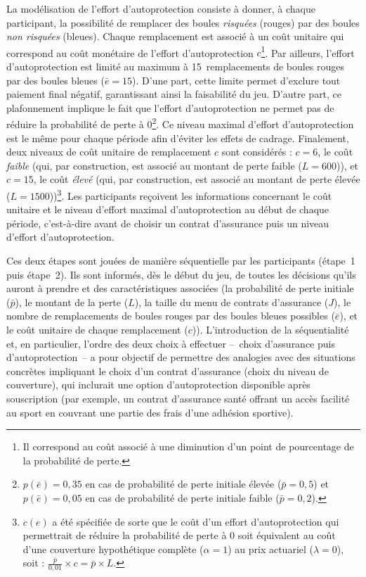 \begin{Article}
\begin{refsection}[Mouminoux]
\vspace{0,2cm}
La modélisation de l'effort d'autoprotection consiste à donner, à chaque participant, la possibilité de remplacer des boules \textit{risquées} (rouges) par des boules \textit{non risquées} (bleues). Chaque remplacement est associé à un coût unitaire qui correspond au coût monétaire de l'effort d'autoprotection $c$\footnote{Il correspond au coût associé à une diminution d'un point de pourcentage de la probabilité de perte.}. Par ailleurs, l'effort d'autoprotection est limité au maximum à 15~remplacements de boules rouges par des boules bleues ($\bar{e} = 15$). D’une part, cette limite permet d’exclure tout paiement final négatif, garantissant ainsi la faisabilité du jeu. D’autre part, ce plafonnement implique le fait que l'effort d'autoprotection ne permet pas de réduire la probabilité de perte à 0\footnote{$p(\bar{e}) = 0,35$ en cas de probabilité de perte initiale élevée ($\bar{p} = 0,5$) et $p(\bar{e}) = 0,05$ en cas de probabilité de perte initiale faible ($\bar{p} = 0,2$).}. Ce niveau maximal d'effort d'autoprotection est le même pour chaque période afin d'éviter les effets de cadrage. Finalement, deux niveaux de coût unitaire de remplacement $c$ sont considérés :  $c=6$, le coût \textit{faible} (qui, par construction, est associé au montant de perte faible ($L=600$)), et $c=15$, le coût \textit{élevé} (qui, par construction, est associé au montant de perte élevée ($L=1500$))\footnote{$c(e)$ a été spécifiée de sorte que le coût d'un effort d'autoprotection qui permettrait de réduire la probabilité de perte à 0 soit équivalent au coût d'une couverture hypothétique complète ($\alpha=1$) au prix actuariel ($\lambda =0$), soit : $\frac{\bar p}{0,01}\times c=\bar p \times L$.}. Les participants reçoivent les informations concernant le coût unitaire et le niveau d'effort maximal d'autoprotection au début de chaque période, c'est-à-dire avant de choisir un contrat d'assurance puis un niveau d'effort d'autoprotection.

Ces deux étapes sont jouées de manière séquentielle par les participants (étape~1 puis étape~2). Ils sont informés, dès le début du jeu, de toutes les décisions qu'ils auront à prendre et des caractéristiques associées (la probabilité de perte initiale ($\bar{p}$), le montant de la perte ($L$), la taille du menu de contrats d'assurance ($J$), le nombre de remplacements de boules rouges par des boules bleues possibles ($\bar{e}$), et le coût unitaire de chaque remplacement ($c$)). L'introduction de la séquentialité et, en particulier, l'ordre des deux choix à effectuer --~choix d'assurance puis d'autoprotection~-- a pour objectif de permettre des analogies avec des situations concrètes impliquant le choix d'un contrat d'assurance (choix du niveau de couverture), qui inclurait une option d'autoprotection disponible après souscription (par exemple, un contrat d'assurance santé offrant un accès facilité au sport en couvrant une partie des frais d'une adhésion sportive).


\end{refsection}
\end{Article}

